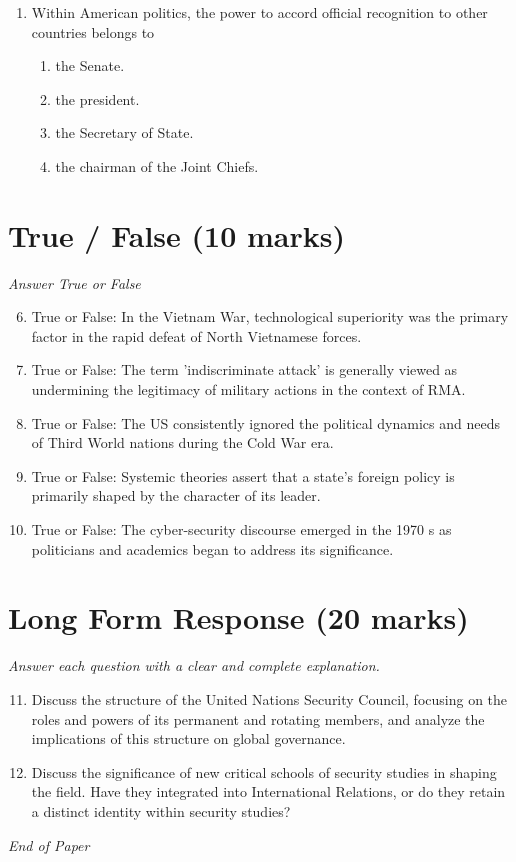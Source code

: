 \documentclass[12pt]{article}
\begin{document}
\begin{enumerate}[label=\arabic*.]
\begin{enumerate}[label=(\alph*)]
    \item Abraham Lincoln
    \item Woodrow Wilson
    \item Thomas Jefferson
\end{enumerate}
\item Within American politics, the power to accord official recognition to other countries belongs to
\begin{enumerate}[label=(\alph*)]
    \item the Senate.
    \item the president.
    \item the Secretary of State.
    \item the chairman of the Joint Chiefs.
\end{enumerate}
\end{enumerate}

\section*{True / False (10 marks)}
\textit{Answer True or False}
\begin{enumerate}[label=\arabic*.]
\setcounter{enumi}{5}
\item True or False: In the Vietnam War, technological superiority was the primary factor in the rapid defeat of North Vietnamese forces.
\item True or False: The term 'indiscriminate attack' is generally viewed as undermining the legitimacy of military actions in the context of RMA.
\item True or False: The US consistently ignored the political dynamics and needs of Third World nations during the Cold War era.
\item True or False: Systemic theories assert that a state's foreign policy is primarily shaped by the character of its leader.
\item True or False: The cyber-security discourse emerged in the 1970 s as politicians and academics began to address its significance.
\end{enumerate}

\section*{Long Form Response (20 marks)}
\textit{Answer each question with a clear and complete explanation.}
\begin{enumerate}[label=\arabic*.]
\setcounter{enumi}{10}
\item Discuss the structure of the United Nations Security Council, focusing on the roles and powers of its permanent and rotating members, and analyze the implications of this structure on global governance.
\item Discuss the significance of new critical schools of security studies in shaping the field. Have they integrated into International Relations, or do they retain a distinct identity within security studies?
\end{enumerate}

\vfill
\noindent\textit{End of Paper}
\end{document}
